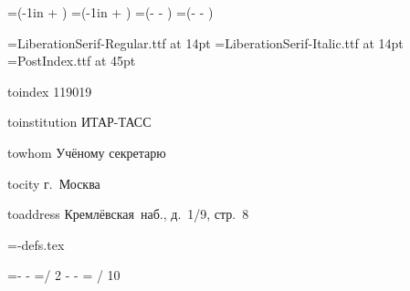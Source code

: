 



\pagewidth=229mm
\pageheight=162mm
\newdimen\leftOffset \leftOffset=2cm
\newdimen\topOffset \topOffset=2cm
\newdimen\rightOffset \rightOffset=2cm
\newdimen\bottomOffset \bottomOffset=2cm
\hoffset=\dimexpr (-1in + \leftOffset) \relax
\voffset=\dimexpr (-1in + \topOffset) \relax
\hsize=\dimexpr (\pagewidth - \leftOffset - \rightOffset) \relax
\vsize=\dimexpr (\pageheight - \topOffset - \bottomOffset) \relax
\parindent=0pt
\parskip=14pt
\baselineskip
\nopagenumbers
{}

\font\myfont={LiberationSerif-Regular.ttf} at 14pt
\font\myfontit={LiberationSerif-Italic.ttf} at 14pt
\font\postindex={PostIndex.ttf} at 45pt
\myfont
\overfullrule=0pt

\def\setfallback#1#2{%
  \ifcsname#1\endcsname\else
    \expandafter\def\csname#1\endcsname{#2}%
  \fi
}

\setfallback{toindex}{119019}
\setfallback{toinstitution}{ИТАР-ТАСС}
\setfallback{towhom}{Учёному секретарю}
\setfallback{tocity}{г.~Москва}
\setfallback{toaddress}{Кремлёвская~наб., д.~1/9, стр.~8}

=\jobname-defs.tex
\else{}\fi

\raggedright
\def\raggedleft{%
  \leftskip=0pt plus 1fil
  \rightskip=0pt
  \parfillskip=0pt
  \parindent=0pt
}

\newdimen\fullhsize
\fullhsize=\dimexpr \pagewidth - \leftOffset - \rightOffset \relax
\newdimen\halfhsize
\halfhsize=\dimexpr \pagewidth / 2 - \leftOffset - \rightOffset \relax
\newdimen\tohsize
\tohsize=\dimexpr {} / 10 \relax  %

\newbox\tobox
\newbox\idxbox

\newdimen\idxreserve
\newcount\mscale
\newdimen\needed

\def\setfonts#1{%
  \mscale=#1\relax
  \font\myfont={LiberationSerif-Regular.ttf} at \dimexpr 14pt * \mscale / 1000 \relax
  \font\myfontit={LiberationSerif-Italic.ttf} at \dimexpr 14pt * \mscale / 1000 \relax
  \myfont
}

\def\rebuildboxes{%
  \setbox\tobox=\vbox{%
    \hsize=\tohsize
    \parindent=0pt
    \raggedleft
    {\myfontit Кому:}
    \ifx\towhom\empty\else\towhom\break\fi
    \toinstitution \par
    {\myfontit Куда:}
    \toaddress \break
    \tocity \break
    \toindex
  }%
  \needed=\dimexpr
    \ht\tobox  + \dp\tobox
    + \idxreserve
    + 10mm \relax
}

